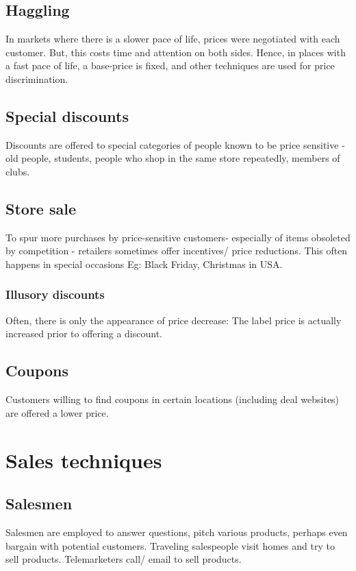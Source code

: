 \documentclass[oneside, article]{memoir}
\begin{document}
\subsection{Haggling}
In markets where there is a slower pace of life, prices were negotiated with each customer. But, this costs time and attention on both sides. Hence, in places with a fast pace of life, a base-price is fixed, and other techniques are used for price discrimination.

\subsection{Special discounts}
Discounts are offered to special categories of people known to be price sensitive - old people, students, people who shop in the same store repeatedly, members of clubs.

\subsection{Store sale}
To spur more purchases by price-sensitive customers- especially of items obsoleted by competition - retailers sometimes offer incentives/ price reductions. This often happens in special occasions Eg: Black Friday, Christmas in USA.

\subsubsection{Illusory discounts}
Often, there is only the appearance of price decrease: The label price is actually increased prior to offering a discount.

\subsection{Coupons}
Customers willing to find coupons in certain locations (including deal websites) are offered a lower price.

\section{Sales techniques}
\subsection{Salesmen}
Salesmen  are employed to answer questions, pitch various products, perhaps even bargain with potential customers. Traveling salespeople visit homes and try to sell products. Telemarketers call/ email to sell products.
\end{document}
